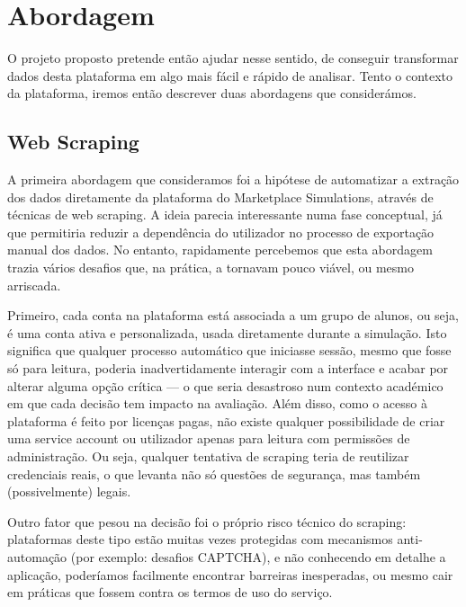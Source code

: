 \section{Abordagem}
\label{sec:abordagem}

O projeto proposto pretende então ajudar nesse sentido, de conseguir transformar dados desta plataforma em algo mais fácil e rápido de analisar. Tento o contexto da plataforma, iremos então descrever duas abordagens que considerámos.

\subsection{Web Scraping}
A primeira abordagem que consideramos foi a hipótese de automatizar a extração dos dados diretamente da plataforma do Marketplace Simulations, através de técnicas de web scraping. A ideia parecia interessante numa fase conceptual, já que permitiria reduzir a dependência do utilizador no processo de exportação manual dos dados. No entanto, rapidamente percebemos que esta abordagem trazia vários desafios que, na prática, a tornavam pouco viável, ou mesmo arriscada.

Primeiro, cada conta na plataforma está associada a um grupo de alunos, ou seja, é uma conta ativa e personalizada, usada diretamente durante a simulação. Isto significa que qualquer processo automático que iniciasse sessão, mesmo que fosse só para leitura, poderia inadvertidamente interagir com a interface e acabar por alterar alguma opção crítica — o que seria desastroso num contexto académico em que cada decisão tem impacto na avaliação. Além disso, como o acesso à plataforma é feito por licenças pagas, não existe qualquer possibilidade de criar uma service account ou utilizador apenas para leitura com permissões de administração. Ou seja, qualquer tentativa de scraping teria de reutilizar credenciais reais, o que levanta não só questões de segurança, mas também (possivelmente) legais.  

Outro fator que pesou na decisão foi o próprio risco técnico do scraping: plataformas deste tipo estão muitas vezes protegidas com mecanismos anti-automação (por exemplo: desafios CAPTCHA), e não conhecendo em detalhe a aplicação, poderíamos facilmente encontrar barreiras inesperadas, ou mesmo cair em práticas que fossem contra os termos de uso do serviço.

